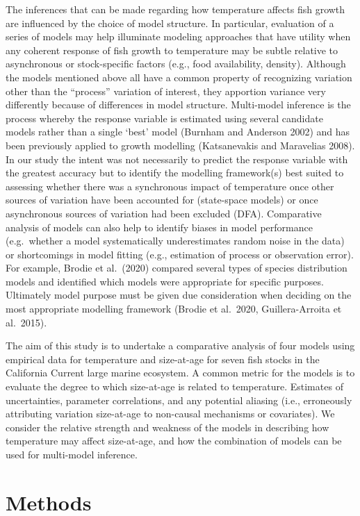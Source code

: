 \documentclass[
]{article}
\begin{document}
The inferences that can be made regarding how temperature affects fish
growth are influenced by the choice of model structure. In particular,
evaluation of a series of models may help illuminate modeling approaches
that have utility when any coherent response of fish growth to
temperature may be subtle relative to asynchronous or stock-specific
factors (e.g., food availability, density). Although the models
mentioned above all have a common property of recognizing variation
other than the ``process'' variation of interest, they apportion
variance very differently because of differences in model structure.
Multi-model inference is the process whereby the response variable is
estimated using several candidate models rather than a single `best'
model (Burnham and Anderson 2002) and has been previously applied to
growth modelling (Katsanevakis and Maravelias 2008). In our study the
intent was not necessarily to predict the response variable with the
greatest accuracy but to identify the modelling framework(s) best suited
to assessing whether there was a synchronous impact of temperature once
other sources of variation have been accounted for (state-space models)
or once asynchronous sources of variation had been excluded (DFA).
Comparative analysis of models can also help to identify biases in model
performance (e.g.~whether a model systematically underestimates random
noise in the data) or shortcomings in model fitting (e.g., estimation of
process or observation error). For example, Brodie et al.~(2020)
compared several types of species distribution models and identified
which models were appropriate for specific purposes. Ultimately model
purpose must be given due consideration when deciding on the most
appropriate modelling framework (Brodie et al.~2020, Guillera-Arroita et
al.~2015).

The aim of this study is to undertake a comparative analysis of four
models using empirical data for temperature and size-at-age for seven
fish stocks in the California Current large marine ecosystem. A common
metric for the models is to evaluate the degree to which size-at-age is
related to temperature. Estimates of uncertainties, parameter
correlations, and any potential aliasing (i.e., erroneously attributing
variation size-at-age to non-causal mechanisms or covariates). We
consider the relative strength and weakness of the models in describing
how temperature may affect size-at-age, and how the combination of
models can be used for multi-model inference.

\hypertarget{methods}{%
\section{Methods}\label{methods}}
\end{document}
